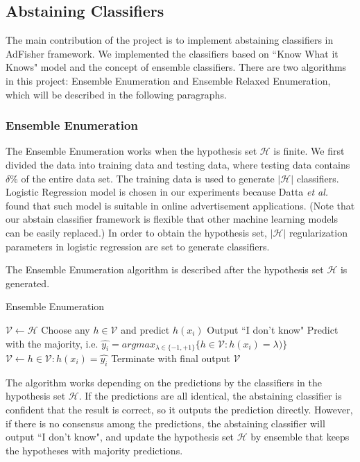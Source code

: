 \documentclass[12pt, journal]{IEEEtran}
\begin{document}
\subsection{Abstaining Classifiers}
The main contribution of the project is to implement abstaining classifiers in AdFisher framework.
We implemented the classifiers based on ``Know What it Knows" model and the concept of ensemble classifiers.
There are two algorithms in this project: Ensemble Enumeration and Ensemble Relaxed Enumeration, which will be described in the following paragraphs.

\subsubsection{Ensemble Enumeration} 
The Ensemble Enumeration works when the hypothesis set $\mathcal{H}$ is finite.
We first divided the data into training data and testing data, where testing data contains $ \delta \%$ of the entire data set. 
The training data is used to generate $|\mathcal{H}|$ classifiers.
Logistic Regression model is chosen in our experiments because Datta \textit{et al.} \cite{datta} found that such model is suitable in online advertisement applications.
(Note that our abstain classifier framework is flexible that other machine learning models can be easily replaced.)
In order to obtain the hypothesis set, $|\mathcal{H}|$ regularization parameters in logistic regression are set to generate classifiers.

The Ensemble Enumeration algorithm is described after the hypothesis set $\mathcal{H}$ is generated.
\begin{algorithm}[h]
  \caption{Ensemble Enumeration}
  \begin{algorithmic}[1]
   \State $\mathcal{V} \gets \mathcal{H}$  
      \State Choose any $h \in \mathcal{V}$ and predict $h(x_i)$
      \Else 
      \State Output ``I don't know"
      \State Predict with the majority, i.e. $\hat{y_{i}} = argmax_{\lambda\in \{-1,+1\} } \{h \in \mathcal{V}: h(x_i)=\lambda)\}$
      \State $\mathcal{V} \gets {h \in \mathcal{V}:h(x_i)=\hat{y_{i}}}$
      \EndIf
      \State Terminate with final output $\mathcal{V}$
      \EndIf
    \EndFor
  \end{algorithmic}
\end{algorithm}

The algorithm works depending on the predictions by the classifiers in the hypothesis set $\mathcal{H}$.
If the predictions are all identical, the abstaining classifier is confident that the result is correct, so it outputs the prediction directly.
However, if there is no consensus among the predictions, the abstaining classifier will output ``I don't know", and update the hypothesis set $\mathcal{H}$ by ensemble that keeps the hypotheses with majority predictions. 
\end{document}
